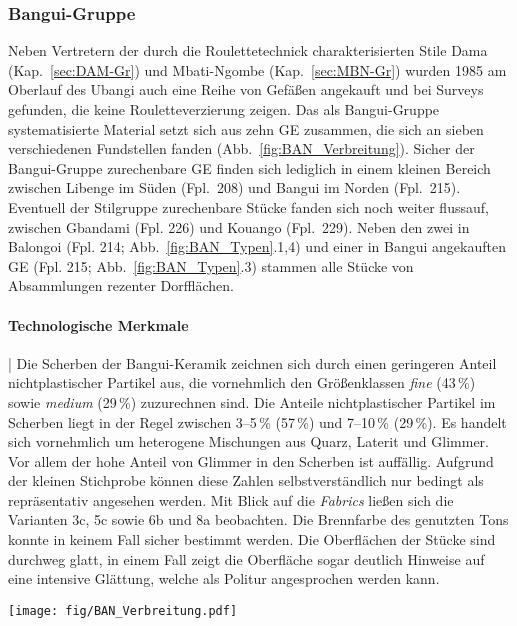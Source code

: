 \subsubsection{Bangui-Gruppe}\label{sec:BAN-Gr}

Neben Vertretern der durch die Roulettetechnick charakterisierten Stile Dama (Kap.~\ref{sec:DAM-Gr}) und Mbati-Ngombe (Kap.~\ref{sec:MBN-Gr}) wurden 1985 am Oberlauf des \mbox{Ubangi} auch eine Reihe von Gefäßen angekauft und bei Surveys gefunden, die keine Rouletteverzierung zeigen. Das als Bangui-Gruppe systematisierte Material setzt sich aus zehn GE zusammen, die sich an sieben verschiedenen Fundstellen fanden (Abb.~\ref{fig:BAN_Verbreitung}). Sicher der Bangui-Gruppe zurechenbare GE finden sich lediglich in einem kleinen Bereich zwischen Libenge im Süden (Fpl.~208) und Bangui im Norden (Fpl.~215). Eventuell der Stilgruppe zurechenbare Stücke fanden sich noch weiter flussauf, zwischen Gbandami (Fpl. 226) und \mbox{Kouango} (Fpl.~229). Neben den zwei in Balongoi (Fpl. 214; Abb.~\ref{fig:BAN_Typen}.1,4) und einer in Bangui angekauften GE (Fpl. 215; Abb.~\ref{fig:BAN_Typen}.3) stammen alle Stücke von Absammlungen rezenter Dorfflächen.

\paragraph{Technologische Merkmale}\hspace{-.5em}|\hspace{.5em}%
Die Scherben der Bangui-Keramik zeichnen sich durch einen geringeren Anteil nichtplastischer Partikel aus, die vornehmlich den Größenklassen \textit{fine} (43\,\%) sowie \textit{medium} (29\,\%) zuzurechnen sind. Die Anteile nichtplastischer Partikel im Scherben liegt in der Regel zwischen 3--5\,\% (57\,\%) und 7--10\,\% (29\,\%). Es handelt sich vornehmlich um heterogene Mischungen aus Quarz, Laterit und Glimmer. Vor allem der hohe Anteil von Glimmer in den Scherben ist auffällig. Aufgrund der kleinen Stichprobe können diese Zahlen selbstverständlich nur bedingt als repräsentativ angesehen werden. Mit Blick auf die \textit{Fabrics} ließen sich die Varianten 3c, 5c sowie 6b und 8a beobachten. Die Brennfarbe des genutzten Tons konnte in keinem Fall sicher bestimmt werden. Die Oberflächen der Stücke sind durchweg glatt, in einem Fall zeigt die Oberfläche sogar deutlich Hinweise auf eine intensive Glättung, welche als Politur angesprochen werden kann.

\begin{figure*}[p]
	\centering
	\texttt{[image: fig/BAN\_Verbreitung.pdf]}
	\caption{Bangui-Gruppe: Verbreitung.}
	\label{fig:BAN_Verbreitung}
\end{figure*}

